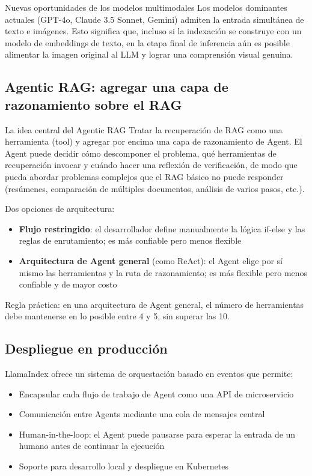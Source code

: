\documentclass[a4paper]{article}
\begin{document}
\begin{knowledgebox}{Nuevas oportunidades de los modelos multimodales}
Los modelos dominantes actuales (GPT-4o, Claude 3.5 Sonnet, Gemini) admiten la entrada simultánea de texto e imágenes. Esto significa que, incluso si la indexación se construye con un modelo de embeddings de texto, en la etapa final de inferencia aún es posible alimentar la imagen original al LLM y lograr una comprensión visual genuina.
\end{knowledgebox}

\subsection{Agentic RAG: agregar una capa de razonamiento sobre el RAG}

\begin{importantbox}{La idea central del Agentic RAG}
Tratar la recuperación de RAG como una herramienta (tool) y agregar por encima una capa de razonamiento de Agent. El Agent puede decidir cómo descomponer el problema, qué herramientas de recuperación invocar y cuándo hacer una reflexión de verificación, de modo que pueda abordar problemas complejos que el RAG básico no puede responder (resúmenes, comparación de múltiples documentos, análisis de varios pasos, etc.).
\end{importantbox}

Dos opciones de arquitectura:
\begin{itemize}
    \item \textbf{Flujo restringido}: el desarrollador define manualmente la lógica if-else y las reglas de enrutamiento; es más confiable pero menos flexible
    \item \textbf{Arquitectura de Agent general} (como ReAct): el Agent elige por sí mismo las herramientas y la ruta de razonamiento; es más flexible pero menos confiable y de mayor costo
\end{itemize}

Regla práctica: en una arquitectura de Agent general, el número de herramientas debe mantenerse en lo posible entre 4 y 5, sin superar las 10.

\subsection{Despliegue en producción}

LlamaIndex ofrece un sistema de orquestación basado en eventos que permite:
\begin{itemize}
    \item Encapsular cada flujo de trabajo de Agent como una API de microservicio
    \item Comunicación entre Agents mediante una cola de mensajes central
    \item Human-in-the-loop: el Agent puede pausarse para esperar la entrada de un humano antes de continuar la ejecución
    \item Soporte para desarrollo local y despliegue en Kubernetes
\end{itemize}
\end{document}
